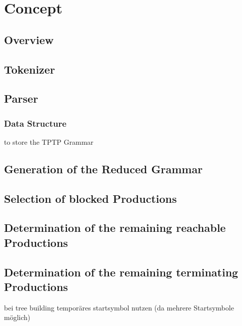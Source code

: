 
\chapter{Concept}\label{cha:Concept}
\section{Overview}\label{sec:ConceptOverview}

\section{Tokenizer}
\section{Parser}
\subsection{Data Structure}
to store the \ac{TPTP} Grammar
\section{Generation of the Reduced Grammar}\label{sec:ConceptGenerateReducedGrammar}

\section{Selection of blocked Productions}

\section{Determination of the remaining reachable Productions}

\section{Determination of  the remaining terminating Productions}


bei tree building temporäres startsymbol nutzen (da mehrere Startsymbole möglich)

